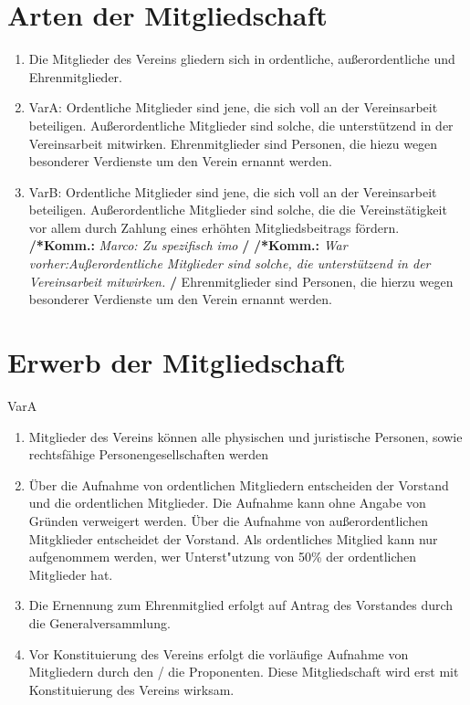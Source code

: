 \documentclass[a4paper,12pt]{article}
\newcommand{\comment}[1]{{\bf /*Komm.:} \textit{#1} {\bf */}}
\begin{document}
\section{Arten der Mitgliedschaft} %
\label{sec:Mitgliedschaft-Arten}
\begin{enumerate}
\item Die Mitglieder des Vereins gliedern sich in ordentliche, außerordentliche und Ehrenmitglieder.

\item VarA: Ordentliche Mitglieder sind jene, die sich voll an der Vereinsarbeit beteiligen. Außerordentliche Mitglieder sind solche, die unterstützend in der Vereinsarbeit mitwirken. Ehrenmitglieder sind Personen, die hiezu wegen besonderer Verdienste um den Verein ernannt werden.

\item VarB: Ordentliche Mitglieder sind jene, die sich voll an der Vereinsarbeit beteiligen.
Außerordentliche Mitglieder sind solche, die die Vereinstätigkeit vor allem durch Zahlung eines erhöhten Mitgliedsbeitrags fördern.
\comment{Marco: Zu spezifisch imo}
\comment{War vorher:Außerordentliche Mitglieder sind solche, die unterstützend in der Vereinsarbeit mitwirken.}
Ehrenmitglieder sind Personen, die hierzu wegen besonderer Verdienste um den Verein ernannt werden.
\end{enumerate}

\section{Erwerb der Mitgliedschaft} %
VarA
\begin{enumerate}
\item Mitglieder des Vereins können alle physischen und juristische Personen, sowie rechtsfähige Personengesellschaften werden
\item Über die Aufnahme von ordentlichen Mitgliedern entscheiden der Vorstand und die ordentlichen Mitglieder. Die Aufnahme kann ohne Angabe von Gründen verweigert werden. Über die Aufnahme
von außerordentlichen Mitgklieder entscheidet der Vorstand. Als ordentliches Mitglied kann
nur aufgenommem werden, wer Unterst"utzung von 50\% der ordentlichen Mitglieder hat.
\item Die Ernennung zum Ehrenmitglied erfolgt auf Antrag des Vorstandes durch die Generalversammlung.
\item Vor Konstituierung des Vereins erfolgt die vorläufige Aufnahme von Mitgliedern durch den / die Proponenten. Diese Mitgliedschaft wird erst mit Konstituierung des Vereins wirksam.
\end{enumerate}
\end{document}
